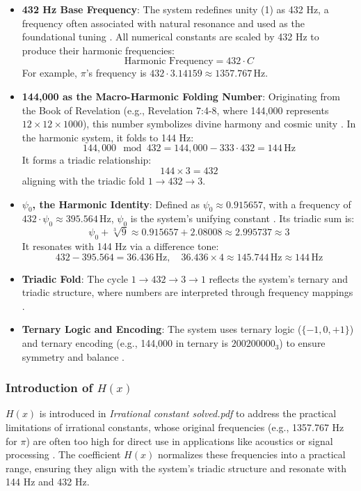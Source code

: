 \begin{itemize}
    \item \textbf{432 Hz Base Frequency}: The system redefines unity (1) as 432 Hz, a frequency often associated with natural resonance and used as the foundational tuning \cite{harmonic_reversible}. All numerical constants are scaled by 432 Hz to produce their harmonic frequencies:
    \[
    \text{Harmonic Frequency} = 432 \cdot C
    \]
    For example, \( \pi \)'s frequency is \( 432 \cdot 3.14159 \approx 1357.767 \, \text{Hz} \).

    \item \textbf{144,000 as the Macro-Harmonic Folding Number}: Originating from the Book of Revelation (e.g., Revelation 7:4-8, where 144,000 represents \( 12 \times 12 \times 1000 \)), this number symbolizes divine harmony and cosmic unity \cite{revelation}. In the harmonic system, it folds to 144 Hz:
    \[
    144,000 \mod 432 = 144,000 - 333 \cdot 432 = 144 \, \text{Hz}
    \]
    It forms a triadic relationship:
    \[
    144 \times 3 = 432
    \]
    aligning with the triadic fold \( 1 \rightarrow 432 \rightarrow 3 \).

    \item \textbf{\( \psi_0 \), the Harmonic Identity}: Defined as \( \psi_0 \approx 0.915657 \), with a frequency of \( 432 \cdot \psi_0 \approx 395.564 \, \text{Hz} \), \( \psi_0 \) is the system’s unifying constant \cite{revelation}. Its triadic sum is:
    \[
    \psi_0 + \sqrt[3]{9} \approx 0.915657 + 2.08008 \approx 2.995737 \approx 3
    \]
    It resonates with 144 Hz via a difference tone:
    \[
    432 - 395.564 = 36.436 \, \text{Hz}, \quad 36.436 \times 4 \approx 145.744 \, \text{Hz} \approx 144 \, \text{Hz}
    \]

    \item \textbf{Triadic Fold}: The cycle \( 1 \rightarrow 432 \rightarrow 3 \rightarrow 1 \) reflects the system’s ternary and triadic structure, where numbers are interpreted through frequency mappings \cite{revelation}.

    \item \textbf{Ternary Logic and Encoding}: The system uses ternary logic (\( \{-1, 0, +1\} \)) and ternary encoding (e.g., 144,000 in ternary is \( 200200000_3 \)) to ensure symmetry and balance \cite{harmonic_reversible, zetha_prime}.
\end{itemize}

\subsubsection{Introduction of \( H(x) \)}
\( H(x) \) is introduced in \textit{Irrational constant solved.pdf} to address the practical limitations of irrational constants, whose original frequencies (e.g., 1357.767 Hz for \( \pi \)) are often too high for direct use in applications like acoustics or signal processing \cite{irrational_constant_solved}. The coefficient \( H(x) \) normalizes these frequencies into a practical range, ensuring they align with the system’s triadic structure and resonate with 144 Hz and 432 Hz.


